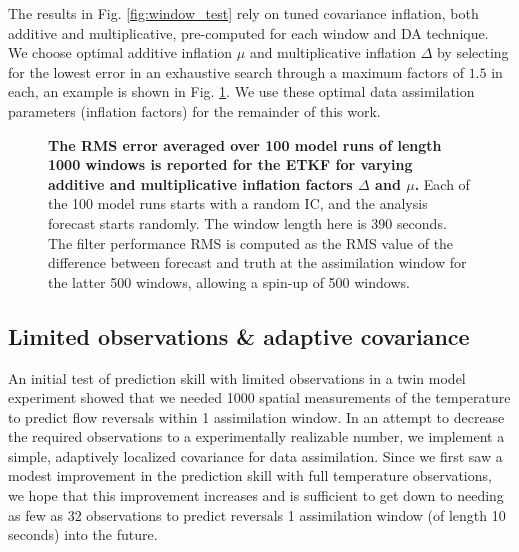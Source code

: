 \documentclass[10pt,letterpaper]{article}
\begin{document}
The results in Fig. \ref{fig:window_test} rely on tuned covariance inflation, both additive and multiplicative, pre-computed for each window and DA technique.
We choose optimal additive inflation $\mu$ and multiplicative inflation $\Delta$ by selecting for the lowest error in an exhaustive search through a maximum factors of $1.5$ in each, an example is shown in Fig. \ref{fig:ETKF_cov_tuning_390s}.
We use these optimal data assimilation parameters (inflation factors) for the remainder of this work.

\begin{figure}[h]
  \centering
  \caption[The RMS error averaged over 100 model runs of length 1000 windows is reported for the ETKF for varying additive and multiplicative inflation factors]{
\textbf{    The RMS error averaged over 100 model runs of length 1000 windows is reported for the ETKF for varying additive and multiplicative inflation factors $\Delta$ and $\mu$.
}    Each of the 100 model runs starts with a random IC, and the analysis forecast starts randomly.
    The window length here is 390 seconds.
    The filter performance RMS is computed as the RMS value of the difference between forecast and truth at the assimilation window for the latter 500 windows, allowing a spin-up of 500 windows.
  }
  \label{fig:ETKF_cov_tuning_390s}
\end{figure}

\subsection*{Limited observations \& adaptive covariance}

An initial test of prediction skill with limited observations in a twin model experiment showed that we needed 1000 spatial measurements of the temperature to predict flow reversals within 1 assimilation window.
In an attempt to decrease the required observations to a experimentally realizable number, we implement a simple, adaptively localized covariance for data assimilation.
Since we first saw a modest improvement in the prediction skill with full temperature observations, we hope that this improvement increases and is sufficient to get down to needing as few as 32 observations to predict reversals 1 assimilation window (of length 10 seconds) into the future.
\end{document}
